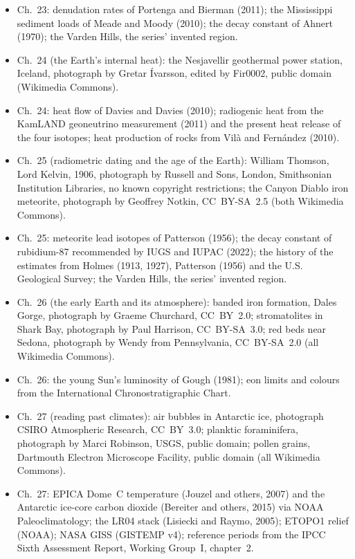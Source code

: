 \begin{itemize}
  \item Ch.~23: denudation rates of Portenga and Bierman (2011); the Mississippi sediment loads of Meade and Moody (2010); the decay constant of Ahnert (1970); the Varden Hills, the series' invented region.
  \item Ch.~24 (the Earth's internal heat): the Nesjavellir geothermal power station, Iceland, photograph by Gretar Ívarsson, edited by Fir0002, public domain (Wikimedia Commons).
  \item Ch.~24: heat flow of Davies and Davies (2010); radiogenic heat from the KamLAND geoneutrino measurement (2011) and the present heat release of the four isotopes; heat production of rocks from Vilà and Fernández (2010).
  \item Ch.~25 (radiometric dating and the age of the Earth): William Thomson, Lord Kelvin, 1906, photograph by Russell and Sons, London, Smithsonian Institution Libraries, no known copyright restrictions; the Canyon Diablo iron meteorite, photograph by Geoffrey Notkin, CC~BY-SA~2.5 (both Wikimedia Commons).
  \item Ch.~25: meteorite lead isotopes of Patterson (1956); the decay constant of rubidium-87 recommended by IUGS and IUPAC (2022); the history of the estimates from Holmes (1913, 1927), Patterson (1956) and the U.S. Geological Survey; the Varden Hills, the series' invented region.
  \item Ch.~26 (the early Earth and its atmosphere): banded iron formation, Dales Gorge, photograph by Graeme Churchard, CC~BY~2.0; stromatolites in Shark Bay, photograph by Paul Harrison, CC~BY-SA~3.0; red beds near Sedona, photograph by Wendy from Pennsylvania, CC~BY-SA~2.0 (all Wikimedia Commons).
  \item Ch.~26: the young Sun's luminosity of Gough (1981); eon limits and colours from the International Chronostratigraphic Chart.
  \item Ch.~27 (reading past climates): air bubbles in Antarctic ice, photograph CSIRO Atmospheric Research, CC~BY~3.0; planktic foraminifera, photograph by Marci Robinson, USGS, public domain; pollen grains, Dartmouth Electron Microscope Facility, public domain (all Wikimedia Commons).
  \item Ch.~27: EPICA Dome~C temperature (Jouzel and others, 2007) and the Antarctic ice-core carbon dioxide (Bereiter and others, 2015) via NOAA Paleoclimatology; the LR04 stack (Lisiecki and Raymo, 2005); ETOPO1 relief (NOAA); NASA GISS (GISTEMP v4); reference periods from the IPCC Sixth Assessment Report, Working Group~I, chapter~2.

\end{itemize}
